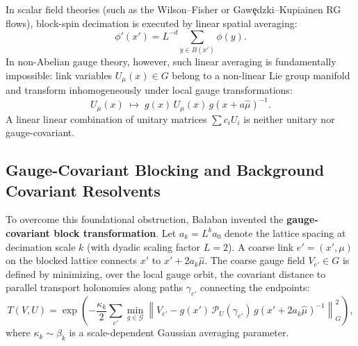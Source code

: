 In scalar field theories (such as the Wilson--Fisher or Gaw\c{e}dzki--Kupiainen RG flows), block-spin decimation is executed by linear spatial averaging:
\begin{equation}
\phi'(x') = L^{-d} \sum_{y \in B(x')} \phi(y).
\end{equation}
In non-Abelian gauge theory, however, such linear averaging is fundamentally impossible: link variables $U_\mu(x) \in G$ belong to a non-linear Lie group manifold and transform inhomogeneously under local gauge transformations:
\begin{equation}
U_\mu(x) \;\mapsto\; g(x) \, U_\mu(x) \, g(x + a\hat{\mu})^{-1}.
\end{equation}
A linear linear combination of unitary matrices $\sum c_i U_i$ is neither unitary nor gauge-covariant.

\subsection{Gauge-Covariant Blocking and Background Covariant Resolvents}
\label{subsec:gauge_covariant_blocking}
To overcome this foundational obstruction, Ba\l aban invented the \textbf{gauge-covariant block transformation}. Let $a_k = L^k a_0$ denote the lattice spacing at decimation scale $k$ (with dyadic scaling factor $L = 2$). A coarse link $e' = (x', \mu)$ on the blocked lattice connects $x'$ to $x' + 2a_k\hat{\mu}$. The coarse gauge field $V_{e'} \in G$ is defined by minimizing, over the local gauge orbit, the covariant distance to parallel transport holonomies along paths $\gamma_{e'}$ connecting the endpoints:
\begin{equation}
\label{eq:balaban_kernel_intro}
T(V, U) = \exp\left( -\frac{\kappa_k}{2} \sum_{e'} \min_{g \in \mathcal{G}} \left\| V_{e'} - g(x') \, \mathcal{P}_U(\gamma_{e'}) \, g(x' + 2a_k\hat{\mu})^{-1} \right\|_G^2 \right),
\end{equation}
where $\kappa_k \sim \beta_k$ is a scale-dependent Gaussian averaging parameter.

